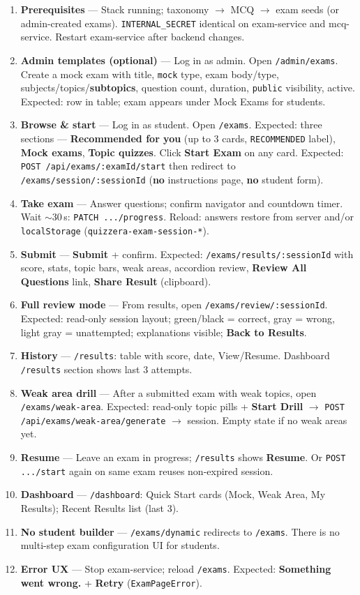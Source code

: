 \documentclass[11pt,a4paper]{article}
\begin{document}
\begin{enumerate}[leftmargin=*]
  \item \textbf{Prerequisites} --- Stack running; taxonomy $\rightarrow$ MCQ $\rightarrow$ exam seeds (or admin-created exams). \texttt{INTERNAL\_SECRET} identical on exam-service and mcq-service. Restart exam-service after backend changes.
  \item \textbf{Admin templates (optional)} --- Log in as admin. Open \texttt{/admin/exams}. Create a mock exam with title, \texttt{mock} type, exam body/type, subjects/topics/\textbf{subtopics}, question count, duration, \texttt{public} visibility, active. Expected: row in table; exam appears under Mock Exams for students.
  \item \textbf{Browse \& start} --- Log in as student. Open \texttt{/exams}. Expected: three sections --- \textbf{Recommended for you} (up to 3 cards, \texttt{RECOMMENDED} label), \textbf{Mock exams}, \textbf{Topic quizzes}. Click \textbf{Start Exam} on any card. Expected: \texttt{POST /api/exams/:examId/start} then redirect to \texttt{/exams/session/:sessionId} (\textbf{no} instructions page, \textbf{no} student form).
  \item \textbf{Take exam} --- Answer questions; confirm navigator and countdown timer. Wait $\sim$30\,s: \texttt{PATCH .../progress}. Reload: answers restore from server and/or \texttt{localStorage} (\texttt{quizzera-exam-session-*}).
  \item \textbf{Submit} --- \textbf{Submit} + confirm. Expected: \texttt{/exams/results/:sessionId} with score, stats, topic bars, weak areas, accordion review, \textbf{Review All Questions} link, \textbf{Share Result} (clipboard).
  \item \textbf{Full review mode} --- From results, open \texttt{/exams/review/:sessionId}. Expected: read-only session layout; green/black = correct, gray = wrong, light gray = unattempted; explanations visible; \textbf{Back to Results}.
  \item \textbf{History} --- \texttt{/results}: table with score, date, View/Resume. Dashboard \texttt{/results} section shows last 3 attempts.
  \item \textbf{Weak area drill} --- After a submitted exam with weak topics, open \texttt{/exams/weak-area}. Expected: read-only topic pills + \textbf{Start Drill} $\rightarrow$ \texttt{POST /api/exams/weak-area/generate} $\rightarrow$ session. Empty state if no weak areas yet.
  \item \textbf{Resume} --- Leave an exam in progress; \texttt{/results} shows \textbf{Resume}. Or \texttt{POST .../start} again on same exam reuses non-expired session.
  \item \textbf{Dashboard} --- \texttt{/dashboard}: Quick Start cards (Mock, Weak Area, My Results); Recent Results list (last 3).
  \item \textbf{No student builder} --- \texttt{/exams/dynamic} redirects to \texttt{/exams}. There is no multi-step exam configuration UI for students.
  \item \textbf{Error UX} --- Stop exam-service; reload \texttt{/exams}. Expected: \textbf{Something went wrong.} + \textbf{Retry} (\texttt{ExamPageError}).
\end{enumerate}
\end{document}
